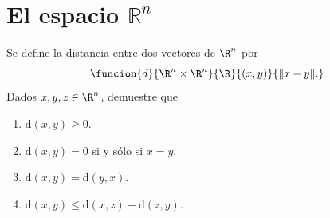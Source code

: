 \documentclass[a4,11pt]{aleph-notas}
\begin{document}
\section{El espacio $\mathbb{R}^n$}

\begin{ejer}
    Se define la distancia entre dos vectores de $\R^n$ por
    \[
        \funcion{d}{\R^n \times \R^n}{\R}{(x,y)}{\|x - y\|.}
    \]
    Dados $x,y,z\in\R^n$, demuestre que
    \begin{enumerate}
        \item 
        $\text{d}(x,y)\geq 0$.
        \item
        $\text{d}(x,y) = 0$ si y sólo si $x=y$.
        \item
        $\text{d}(x,y) = \text{d}(y,x)$.
        \item
        $\text{d}(x,y) \leq \text{d}(x,z) + \text{d}(z,y)$.
    \end{enumerate}
\end{ejer}
\end{document}
